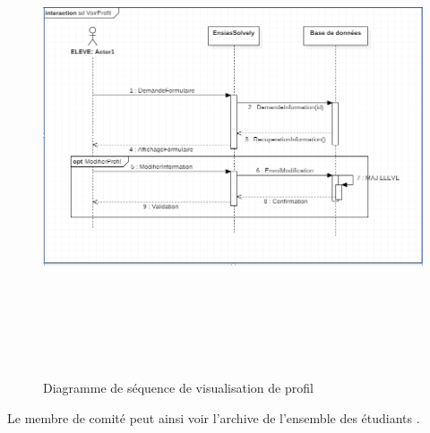 \documentclass[11.5pt]{report}
\begin{document}
\begin{figure}[h]
	
	\begin{center}
		\includegraphics[width=400pt,height=400pt]{seq5.png} 
		\caption{Diagramme de séquence de visualisation de profil}
	\end{center}
	
\end{figure}
\newpage
Le membre de comité peut ainsi voir l’archive de l’ensemble des étudiants .\\
\end{document}
